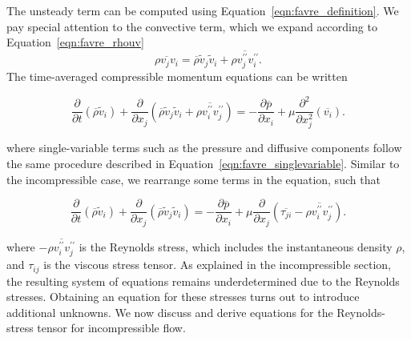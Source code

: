 The unsteady term can be computed using Equation~\ref{eqn:favre_definition}. We pay special attention to the convective term, which we expand according to Equation~\ref{eqn:favre_rhouv}
\begin{equation}
    \overline{\rho v_j v_i} = \overline{\rho}\tilde v_j\tilde v_i + \overline{\rho v_j^{\prime\prime} v_i^{\prime\prime}}.
\end{equation}
The time-averaged compressible momentum equations can be written
\begin{eqBox}
\begin{equation}
    \frac{\partial }{\partial t} \left(\overline\rho \tilde v_i \right)
    + \frac{\partial}{\partial x_j} \left(\overline\rho \tilde v_j \tilde v_i + \overline{\rho v_i^{\prime\prime}v_j^{\prime\prime}} \right)
    = - \frac{\partial \overline{p}}{\partial x_i} 
	+ \mu \frac{\partial^2 }{\partial x_j^2} \left(\overline{v_i}\right).
\end{equation}
\end{eqBox}
where single-variable terms such as the pressure and diffusive components follow the same procedure described in Equation~\ref{eqn:favre_singlevariable}. Similar to the incompressible case, we rearrange some terms in the equation, such that
\begin{eqBox}
    \begin{equation}
        \frac{\partial }{\partial t} \left(\overline\rho \tilde v_i \right)
        + \frac{\partial}{\partial x_j} \left(\overline\rho \tilde v_j \tilde v_i \right)
        = - \frac{\partial \overline{p}}{\partial x_i} 
		+ \mu \frac{\partial }{\partial x_j} \left(\overline{\tau_{ji}} - \overline{\rho v_i^{\prime\prime}v_j^{\prime\prime}}\right).
	\label{eq:favre_rans}
    \end{equation}
\end{eqBox}
where $-\overline{\rho v_i^{\prime\prime}v_j^{\prime\prime}}$ is the Reynolds stress, which includes the instantaneous density $\rho$, and $\tau_{ij}$ is the viscous stress tensor. As explained in the incompressible section, the resulting system of equations remains underdetermined due to the Reynolds stresses. Obtaining an equation for these stresses turns out to introduce additional unknowns. We now discuss and derive equations for the Reynolds-stress tensor for incompressible flow.

